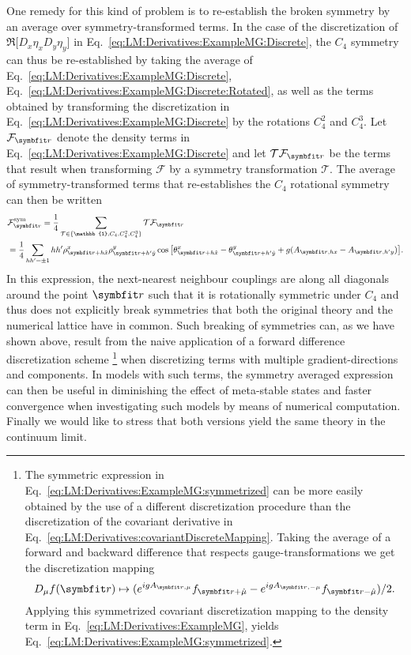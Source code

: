 One remedy for this kind of problem is to re-establish the broken symmetry by an average over symmetry-transformed terms. In the case of the discretization of
$\Re\big[D_x\eta_xD_y\eta_y\big]$ in Eq.~\eqref{eq:LM:Derivatives:ExampleMG:Discrete}, the $C_4$ symmetry can thus be re-established by taking the average of 
Eq.~\eqref{eq:LM:Derivatives:ExampleMG:Discrete},
Eq.~\eqref{eq:LM:Derivatives:ExampleMG:Discrete:Rotated}, as well as the terms obtained by transforming the discretization in Eq.~\eqref{eq:LM:Derivatives:ExampleMG:Discrete}
by the rotations $C_4^2$ and $C_4^3$. Let $\mathcal{F}_\v{r}$ denote the density terms in Eq.~\eqref{eq:LM:Derivatives:ExampleMG:Discrete} and let $\mathcal{T}\mathcal{F}_\v{r}$
be the terms that result when transforming $\mathcal{F}$ by a symmetry transformation $\mathcal{T}$. The average of symmetry-transformed terms that re-establishes the $C_4$
rotational symmetry can then be written
\begin{equation}
    \label{eq:LM:Derivatives:ExampleMG:symmetrized}
    \begin{split}
        &\mathcal{F}_\v{r}^{\text{sym}} = \frac{1}{4}\sum_{\mathcal{T}\in\{\mathbb{1},C_4,C_4^2,C_4^3\}}\mathcal{T}\mathcal{F}_\v{r}\\
        &= \frac{1}{4}\sum_{hh'=\pm 1}hh'\rho^x_{\v{r}+h\hat{x}}\rho^y_{\v{r}+h'\hat{y}}\cos\big[\theta^x_{\v{r}+h\hat{x}}-\theta^y_{\v{r}+h'\hat{y}}+g(A_{\v{r},hx}-A_{\v{r},h'y})\big].
    \end{split}
\end{equation}
In this expression, the next-nearest neighbour couplings are along all diagonals around the point $\v{r}$ such that it is rotationally symmetric under $C_4$ and thus does not
explicitly break symmetries that both the original theory and the numerical lattice have in common. Such breaking of symmetries can, as we have shown above,
result from the naive application of a forward difference discretization scheme%
\footnote{The symmetric expression in Eq.~\eqref{eq:LM:Derivatives:ExampleMG:symmetrized} can be more easily obtained by the use of a different discretization procedure than
the discretization of the covariant derivative in Eq.~\eqref{eq:LM:Derivatives:covariantDiscreteMapping}. Taking the average of a forward and backward difference that
respects gauge-transformations we get the discretization mapping
\begin{equation*}
    D_\mu f(\v{r})\mapsto (e^{igA_{\v{r},\mu}}f_{\v{r}+\hat{\mu}}-e^{igA_{\v{r},-\mu}}f_{\v{r}-\hat{\mu}})/2.
\end{equation*}
Applying this symmetrized covariant discretization mapping to the density term in Eq.~\eqref{eq:LM:Derivatives:ExampleMG}, yields Eq.~\eqref{eq:LM:Derivatives:ExampleMG:symmetrized}.
} %
  when discretizing terms with multiple gradient-directions and components. In models with such terms, the symmetry averaged expression can then be useful in diminishing the effect of 
meta-stable states and faster convergence when investigating such models by means of numerical computation. Finally we would like to stress that both versions yield the same theory
in the continuum limit.

